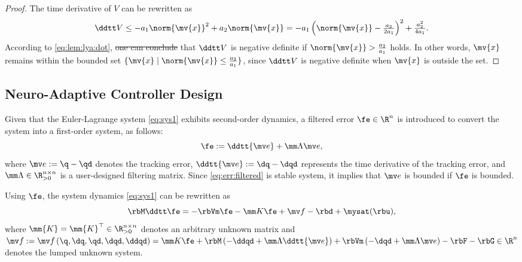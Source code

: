 \documentclass[letterpaper, journal]{IEEEtran}
\providecommand{\DIFadd}[1]{{\protect\color{blue}\uwave{#1}}} %
\providecommand{\DIFdel}[1]{{\protect\color{red}\sout{#1}}} %
\providecommand{\DIFaddbegin}{} %
\providecommand{\DIFaddend}{} %
\providecommand{\DIFdelbegin}{} %
\providecommand{\DIFdelend}{} %
\begin{document}
\begin{proof}
    The time derivative of $V$ can be rewritten as
    \begin{equation}
        \ddtt V
        \le
        -a_1 \norm{\mv{x}}^2 + a_2 \norm{\mv{x}}
        =
        -a_1
        \left(
            \norm{\mv{x}}-\tfrac{a_2}{2a_1}
        \right)^2
        +
        \tfrac{a_2^2}{4a_1}
        .
        \label{eq:lem:lya:dot}
    \end{equation}
    According to \eqref{eq:lem:lya:dot}, \DIFdelbegin \DIFdel{one can conclude }\DIFdelend \DIFaddbegin \DIFadd{it can be concluded }\DIFaddend that $\ddtt V$ is negative definite if $\norm{\mv{x}}>\tfrac{a_2}{a_1}$ holds.
    In other words, $\mv{x}$ remains within the bounded set $\{\mv{x}\mid\norm{\mv{x}}\le\tfrac{a_2}{a_1}\}$, since $\ddtt V$ is negative definite when $\mv{x}$ is outside the set.
\end{proof}


\subsection{Neuro-Adaptive Controller Design}\label{sec:sub:NAC}

Given that the Euler-Lagrange system \eqref{eq:sys1} exhibits second-order dynamics, a filtered error $\fe\in\R^n$ is introduced to convert the system into a first-order system, as follows:
\begin{equation}
    \fe := \ddtt{\mv e}+\mm\Lambda \mv e
    ,
    \label{eq:err:filtered}
\end{equation}
where $\mv e := \q - \qd$ denotes the tracking error, $\ddtt{\mv e} := \dq - \dqd$ represents the time derivative of the tracking error, and $\mm\Lambda\in\R^{n\times n}_{>0}$ is a user-designed filtering matrix.
Since \eqref{eq:err:filtered} is stable system, it implies that $\mv e$ is bounded if $\fe$ is bounded.

Using $\fe$, the system dynamics \eqref{eq:sys1} can be rewritten as
\begin{equation}
    \rbM \ddtt\fe
    =
    -\rbVm \fe
    -\mm K \fe
    + \mv f
    -\rbd + \mysat(\rbu)
    ,
    \label{eq:sys:filtered}
\end{equation}
where $\mm{K}=\mm{K}^\top\in\R^{n\times n}_{>0}$ denotes an arbitrary unknown matrix and $
    \mv f:= \mv f
    \left(
        \q,\dq,\qd,\dqd,\ddqd
    \right)
    =
    \mm K \fe
    +\rbM
    \left(
        -\ddqd+\mm\Lambda\ddtt{\mv e}
    \right)
    +
    \rbVm
    \left(
        -\dqd+\mm\Lambda\mv e
    \right)
    -
    \rbF
    -
    \rbG
    \in\R^n
$ denotes the lumped unknown system.
\end{document}
